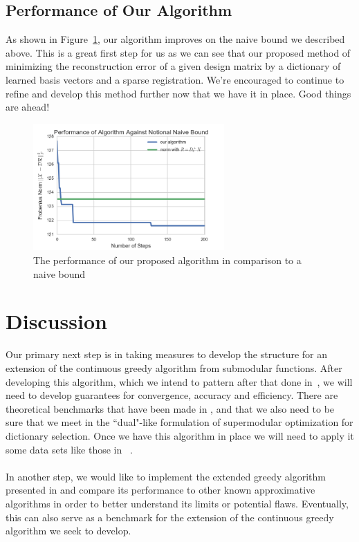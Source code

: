 \documentclass{article}
\begin{document}
\subsection{Performance of Our Algorithm}

As shown in Figure~\ref{fig:ouralg}, our algorithm improves on the naive bound we described above. This is a great first step for us as we can see that our proposed method of minimizing the reconstruction error of a given design matrix by a dictionary of learned basis vectors and a sparse registration. We're encouraged to continue to refine and develop this method further now that we have it in place. Good things are ahead!

\begin{figure}[ht!]
\centering
\includegraphics[width=0.65\textwidth]{src/our_alg.png}
\caption{The performance of our proposed algorithm in comparison to a naive bound}
\label{fig:ouralg}
\end{figure}



\section{Discussion}\label{sec:discuss}

Our primary next step is in taking measures to develop the structure for an extension of the continuous greedy algorithm from submodular functions. After developing this algorithm, which we intend to pattern after that done in~\cite{Singer16TwoStage}, we will need to develop guarantees for convergence, accuracy and efficiency. There are theoretical benchmarks that have been made in \cite{greedy_selection}, \cite{Krause05near-optimalnonmyopic} and \cite{nonconvexrelax} that we also need to be sure that we meet in the ``dual"-like formulation of supermodular optimization for dictionary selection. Once we have this algorithm in place we will need to apply it some data sets like those in ~\cite{Singer16TwoStage}.
\\
\\
In another step, we would like to implement the extended greedy algorithm presented in \cite{weaklyalpha} and compare its performance to other known approximative algorithms in order to better understand its limits or potential flaws. Eventually, this can also serve as a benchmark for the extension of the continuous greedy algorithm we seek to develop.




\end{document}

